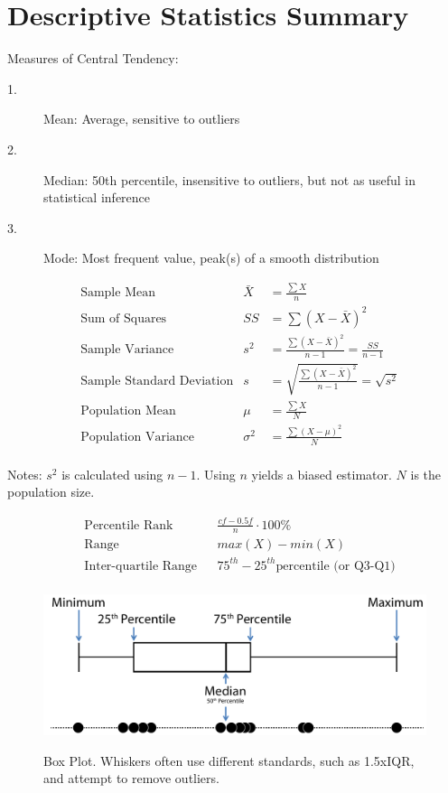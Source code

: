 \documentclass{tufte-handout}
\begin{document}
\section{Descriptive Statistics Summary}

\begin{fullwidth}
Measures of Central Tendency:	
\begin{description}
\item[1.] Mean: Average, sensitive to outliers
\item[2.] Median: 50th percentile, insensitive to outliers, but not as useful in statistical inference
\item[3.] Mode: Most frequent value, peak(s) of a smooth distribution
\end{description}
\end{fullwidth}

\begin{align*}
&\text{Sample Mean} & \bar{X}&=\frac{\sum X}{n}\\
&\text{Sum of Squares} & SS&=\sum (X-\bar{X})^2\\
&\text{Sample Variance} & s^2&=\frac{\sum (X-\bar{X})^2}{n-1} = \frac{SS}{n-1}\\
&\text{Sample Standard Deviation} & s&=\sqrt{\frac{\sum (X-\bar{X})^2}{n-1}}=\sqrt{s^2}\\
&\text{Population Mean} & \mu&=\frac{\sum X}{N}\\
&\text{Population Variance} & \sigma^2&=\frac{\sum (X-\mu)^2}{N}\\
\end{align*}

\begin{fullwidth}
Notes: $s^2$ is calculated using $n-1$. Using $n$ yields a biased estimator. $N$ is the population size.
\end{fullwidth}

\begin{align*} 
&\text{Percentile Rank} & &\frac{cf-0.5f}{n} \cdot 100 \% \\
&\text{Range} & &max(X)-min(X)\\
&\text{Inter-quartile Range} & &75^{th}-25^{th} \text{percentile (or Q3-Q1)}\\
\end{align*}

\begin{figure}%
  \includegraphics[width=\linewidth]{images/handout1_boxplot}%
  \label{fig:fullfig}%
  \caption{Box Plot. Whiskers often use different standards, such as 1.5xIQR, and attempt to remove outliers.}
\end{figure}
\end{document}

